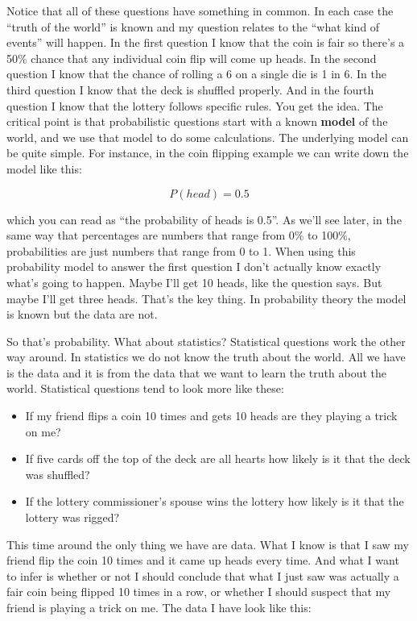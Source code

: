 \documentclass[
  letterpaper,
]{book}
\providecommand{\tightlist}{%
  \setlength{\itemsep}{0pt}\setlength{\parskip}{0pt}}\usepackage{longtable,booktabs,array}
\begin{document}
Notice that all of these questions have something in common. In each
case the ``truth of the world'' is known and my question relates to the
``what kind of events'' will happen. In the first question I know that
the coin is fair so there's a 50\% chance that any individual coin flip
will come up heads. In the second question I know that the chance of
rolling a 6 on a single die is 1 in 6. In the third question I know that
the deck is shuffled properly. And in the fourth question I know that
the lottery follows specific rules. You get the idea. The critical point
is that probabilistic questions start with a known \textbf{model} of the
world, and we use that model to do some calculations. The underlying
model can be quite simple. For instance, in the coin flipping example we
can write down the model like this:

\[P(head)=0.5\]

which you can read as ``the probability of heads is 0.5''. As we'll see
later, in the same way that percentages are numbers that range from 0\%
to 100\%, probabilities are just numbers that range from 0 to 1. When
using this probability model to answer the first question I don't
actually know exactly what's going to happen. Maybe I'll get 10 heads,
like the question says. But maybe I'll get three heads. That's the key
thing. In probability theory the model is known but the data are not.

So that's probability. What about statistics? Statistical questions work
the other way around. In statistics we do not know the truth about the
world. All we have is the data and it is from the data that we want to
learn the truth about the world. Statistical questions tend to look more
like these:

\begin{itemize}
\tightlist
\item
  If my friend flips a coin 10 times and gets 10 heads are they playing
  a trick on me?
\item
  If five cards off the top of the deck are all hearts how likely is it
  that the deck was shuffled?
\item
  If the lottery commissioner's spouse wins the lottery how likely is it
  that the lottery was rigged?
\end{itemize}

This time around the only thing we have are data. What I know is that I
saw my friend flip the coin 10 times and it came up heads every time.
And what I want to infer is whether or not I should conclude that what I
just saw was actually a fair coin being flipped 10 times in a row, or
whether I should suspect that my friend is playing a trick on me. The
data I have look like this:
\end{document}
